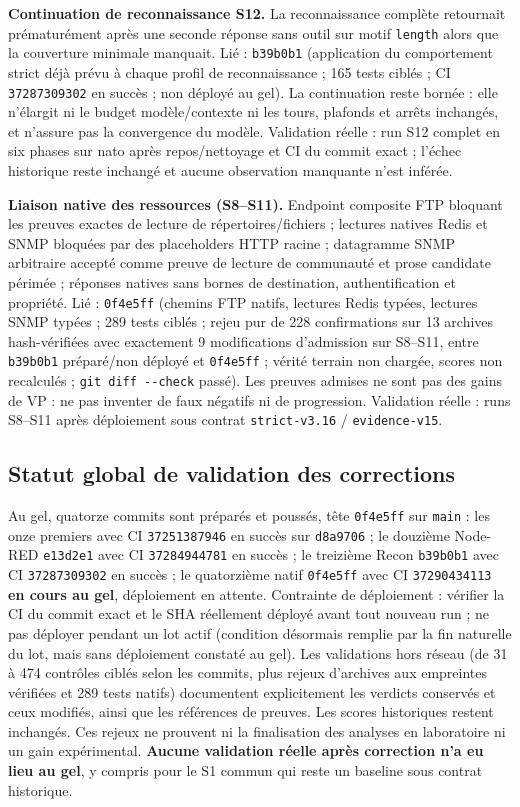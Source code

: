 \documentclass[11pt,a4paper]{article}
\newcommand{\code}[1]{{\urlstyle{tt}\nolinkurl{#1}}}
\begin{document}
\textbf{Continuation de reconnaissance S12.} La reconnaissance compl\`ete retournait pr\'ematur\'ement apr\`es une seconde r\'eponse sans outil sur motif \code{length} alors que la couverture minimale manquait. Li\'e : \code{b39b0b1} (application du comportement strict d\'ej\`a pr\'evu \`a chaque profil de reconnaissance ; 165 tests ciblés ; CI \code{37287309302} en succès ; non déployé au gel). La continuation reste born\'ee : elle n'\'elargit ni le budget mod\`ele/contexte ni les tours, plafonds et arr\^ets inchang\'es, et n'assure pas la convergence du mod\`ele. Validation r\'eelle : run S12 complet en six phases sur nato apr\`es repos/nettoyage et CI du commit exact ; l'\'echec historique reste inchang\'e et aucune observation manquante n'est inf\'er\'ee.

\textbf{Liaison native des ressources (S8--S11).} Endpoint composite FTP bloquant les preuves exactes de lecture de r\'epertoires/fichiers ; lectures natives Redis et SNMP bloqu\'ees par des placeholders HTTP racine ; datagramme SNMP arbitraire accept\'e comme preuve de lecture de communaut\'e et prose candidate p\'erim\'ee ; r\'eponses natives sans bornes de destination, authentification et propri\'et\'e. Li\'e : \code{0f4e5ff} (chemins FTP natifs, lectures Redis typ\'ees, lectures SNMP typ\'ees ; 289 tests ciblés ; rejeu pur de 228 confirmations sur 13 archives hash-v\'erifi\'ees avec exactement 9 modifications d'admission sur S8--S11, entre \code{b39b0b1} préparé/non déployé et \code{0f4e5ff} ; vérité terrain non chargée, scores non recalcul\'es ; \code{git diff --check} pass\'e). Les preuves admises ne sont pas des gains de VP : ne pas inventer de faux n\'egatifs ni de progression. Validation r\'eelle : runs S8--S11 apr\`es d\'eploiement sous contrat \code{strict-v3.16} / \code{evidence-v15}.

\subsection{Statut global de validation des corrections}
Au gel, quatorze commits sont préparés et poussés, tête \code{0f4e5ff} sur \code{main} : les onze premiers avec CI \code{37251387946} en succ\`es sur \code{d8a9706} ; le douzi\`eme Node-RED \code{e13d2e1} avec CI \code{37284944781} en succ\`es ; le treizi\`eme Recon \code{b39b0b1} avec CI \code{37287309302} en succ\`es ; le quatorzi\`eme natif \code{0f4e5ff} avec CI \code{37290434113} \textbf{en cours au gel}, d\'eploiement en attente. Contrainte de d\'eploiement : v\'erifier la CI du commit exact et le SHA r\'eellement d\'eploy\'e avant tout nouveau run ; ne pas d\'eployer pendant un lot actif (condition d\'esormais remplie par la fin naturelle du lot, mais sans d\'eploiement constat\'e au gel). Les validations hors r\'eseau (de 31 \`a 474 contr\^oles cibl\'es selon les commits, plus rejeux d'archives aux empreintes v\'erifi\'ees et 289 tests natifs) documentent explicitement les verdicts conserv\'es et ceux modifi\'es, ainsi que les r\'ef\'erences de preuves. Les scores historiques restent inchang\'es. Ces rejeux ne prouvent ni la finalisation des analyses en laboratoire ni un gain exp\'erimental. \textbf{Aucune validation r\'eelle apr\`es correction n'a eu lieu au gel}, y compris pour le S1 commun qui reste un baseline sous contrat historique.
\end{document}
